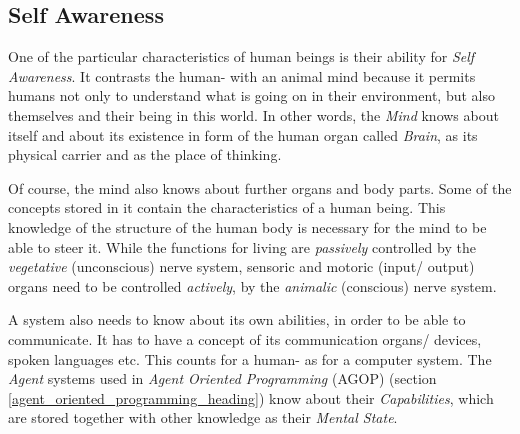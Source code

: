 %
%
%
%
%
%
%

\subsection{Self Awareness}
\label{self_awareness_heading}

One of the particular characteristics of human beings is their ability for
\emph{Self Awareness}. It contrasts the human- with an animal mind because it
permits humans not only to understand what is going on in their environment,
but also themselves and their being in this world. In other words, the
\emph{Mind} knows about itself and about its existence in form of the human
organ called \emph{Brain}, as its physical carrier and as the place of
thinking.

Of course, the mind also knows about further organs and body parts. Some of the
concepts stored in it contain the characteristics of a human being. This
knowledge of the structure of the human body is necessary for the mind to be
able to steer it. While the functions for living are \emph{passively}
controlled by the \emph{vegetative} (unconscious) nerve system, sensoric and
motoric (input/ output) organs need to be controlled \emph{actively}, by the
\emph{animalic} (conscious) nerve system.

A system also needs to know about its own abilities, in order to be able to
communicate. It has to have a concept of its communication organs/ devices,
spoken languages etc. This counts for a human- as for a computer system. The
\emph{Agent} systems used in \emph{Agent Oriented Programming} (AGOP) (section
\ref{agent_oriented_programming_heading}) know about their \emph{Capabilities},
which are stored together with other knowledge as their \emph{Mental State}.



